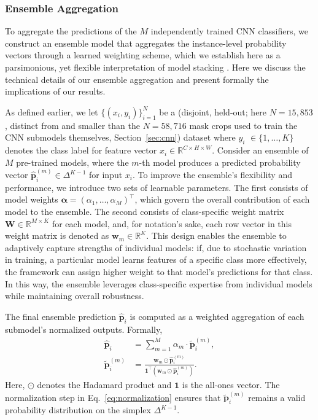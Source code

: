 \documentclass[11pt]{elsarticle}
\begin{document}
\subsubsection{Ensemble Aggregation}
\label{sec:ensemble_aggregation}

To aggregate the predictions of the $M$ independently trained CNN classifiers, we construct an ensemble model that aggregates the instance-level probability vectors through a learned weighting scheme, which we establish here as a parsimonious, yet flexible interpretation of model stacking \citep{wolpert1992stacked, dietterich2000ensemble}. Here we discuss the technical details of our ensemble aggregation and present formally the implications of our results.

As defined earlier, we let $\{(x_i, y_i)\}_{i=1}^N$ be a (disjoint, held-out; here $N=15{,}853$, distinct from and smaller than the $N=58{,}716$ mask crops used to train the CNN submodels themselves, Section~\ref{sec:cnn}) dataset where $y_i$ $\in \{1, \ldots, K\}$ denotes the class label for feature vector $x_i\in\mathbb{R}^{C\times H\times W}$. Consider an ensemble of $M$ pre-trained models, where the $m$-th model produces a predicted probability vector $\hat{\bm{p}}^{(m)}_i \in \Delta^{K-1}$ for input $x_i$. To improve the ensemble's flexibility and performance, we introduce two sets of learnable parameters. The first consists of model weights $\bm{\alpha} = (\alpha_1, \dots, \alpha_M)^\intercal$, which govern the overall contribution of each model to the ensemble. The second consists of class-specific weight matrix $\bm{W} \in \mathbb{R}^{M\times K}$ for each model, and, for notation's sake, each row vector in this weight matrix is denoted as $\bm{w}_m \in \mathbb{R}^K$. This design enables the ensemble to adaptively capture strengths of individual models: if, due to stochastic variation in training, a particular model learns features of a specific class more effectively, the framework can assign higher weight to that model's predictions for that class. In this way, the ensemble leverages class-specific expertise from individual models while maintaining overall robustness.

The final ensemble prediction $\hat{\bm{p}}_i$ is computed as a weighted aggregation of each submodel's normalized outputs. Formally,
\begin{align}
\hat{\bm{p}}_i &= \sum_{m=1}^M \alpha_m \cdot \tilde{\bm{p}}^{(m)}_i,\label{eq:aggregation} \\
\tilde{\bm{p}}^{(m)}_i &= \frac{\bm{w}_m \odot \hat{\bm{p}}^{(m)}_i}{\bm{1}^\intercal \left(\bm{w}_m \odot \hat{\bm{p}}^{(m)}_i\right)}.
\label{eq:normalization}
\end{align}
Here, $\odot$ denotes the Hadamard product and $\bm{1}$ is the all-ones vector. The normalization step in Eq.~\ref{eq:normalization} ensures that $\tilde{\bm{p}}^{(m)}_i$ remains a valid probability distribution on the simplex $\Delta^{K-1}$.
\end{document}
